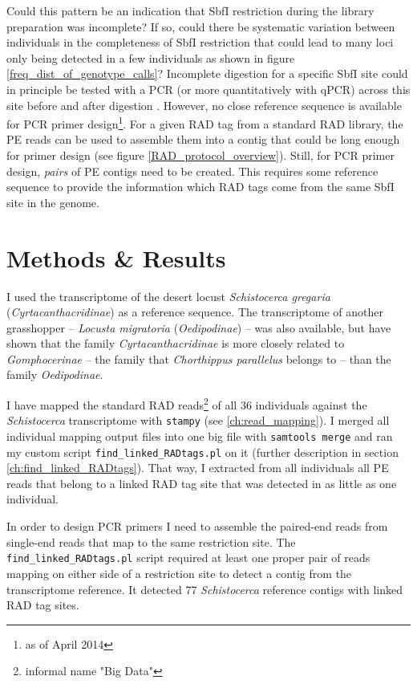 \documentclass[a4paper,12pt,times,print,index, custombib]{PhDThesisPSnPDF}\usepackage[]{graphicx}\usepackage[]{color}
\begin{document}
Could this pattern be an indication that SbfI restriction during the library preparation was incomplete? If so, could there be systematic variation between individuals  in the completeness of SbfI restriction that could lead to many loci only being detected in a few individuals as shown in figure \ref{freq_dist_of_genotype_calls}?
Incomplete digestion for a specific SbfI site could in principle be tested with a PCR (or more quantitatively with qPCR) across this site before and after digestion \citep{Luca2011}. However, no close reference sequence is available for PCR primer design\footnote{as of April 2014}. For a given \gls{RAD tag} from a standard RAD library, the PE reads can be used to assemble them into a \gls{contig} that could be long enough for primer design (see figure \ref{RAD_protocol_overview}).
Still, for PCR primer design, \emph{pairs} of PE \glspl{contig} need to be created. This requires some reference sequence to provide the information which \glspl{RAD tag} come from the same SbfI site in the genome.


\section{Methods \& Results}

I used the transcriptome of the desert locust \textit{Schistocerca gregaria} (\textit{Cyrtacanthacridinae}) \citep{Badisco2011} as a reference sequence. The transcriptome of another grasshopper -- \textit{Locusta migratoria} (\textit{Oedipodinae}) \citep{Kang2004} -- was also available, but \cite{Liu2008a} have shown that the family \textit{Cyrtacanthacridinae} is more closely related to \textit{Gomphocerinae} -- the family that \textit{Chorthippus parallelus} belongs to -- than the family \textit{Oedipodinae}.

I have mapped the standard RAD reads\footnote{informal name "Big Data"} of all 36 individuals against the \textit{Schistocerca} transcriptome with \texttt{stampy} \citep{Lunter2011} (see \vref{ch:read_mapping}). I merged all individual mapping output files into one big file with \texttt{samtools merge} and ran my custom script \texttt{find\_linked\_RADtags.pl} on it (further description in section \ref{ch:find_linked_RADtags}). That way, I extracted from all individuals all PE reads that belong to a \gls{linked RAD tag site} that was detected in as little as one individual.

In order to design PCR primers I need to assemble the paired-end reads from single-end reads that map to the same restriction site. The \texttt{find\_linked\_RADtags.pl} script required at least one \gls{proper pair} of reads mapping on either side of a restriction site to detect a contig from the transcriptome reference. It detected 77 \textit{Schistocerca} reference contigs with \glspl{linked RAD tag site}.
\end{document}
